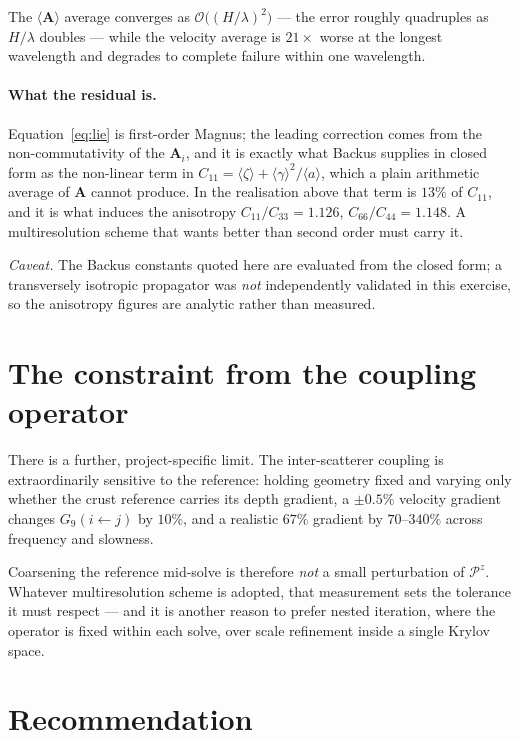 \documentclass[11pt,a4paper]{article}
\newcommand{\bA}{\mathbf{A}}
\newcommand{\avg}[1]{\langle #1 \rangle}
\begin{document}
The $\avg{\bA}$ average converges as $\mathcal{O}\bigl((H/\lambda)^2\bigr)$ ---
the error roughly quadruples as $H/\lambda$ doubles --- while the velocity
average is $21\times$ worse at the longest wavelength and degrades to complete
failure within one wavelength.

\paragraph{What the residual is.}  Equation~\eqref{eq:lie} is first-order
Magnus; the leading correction comes from the non-commutativity of the
$\bA_i$, and it is exactly what Backus supplies in closed form as the
non-linear term in
$C_{11} = \avg{\zeta} + \avg{\gamma}^2/\avg{a}$, which a plain arithmetic
average of $\bA$ cannot produce.  In the realisation above that term is
$13\%$ of $C_{11}$, and it is what induces the anisotropy
$C_{11}/C_{33} = 1.126$, $C_{66}/C_{44} = 1.148$.  A multiresolution scheme
that wants better than second order must carry it.

\emph{Caveat.}  The Backus constants quoted here are evaluated from the closed
form; a transversely isotropic propagator was \emph{not} independently
validated in this exercise, so the anisotropy figures are analytic rather than
measured.

\section{The constraint from the coupling operator}

There is a further, project-specific limit.  The inter-scatterer coupling is
extraordinarily sensitive to the reference: holding geometry fixed and varying
only whether the crust reference carries its depth gradient, a $\pm0.5\%$
velocity gradient changes $G_9(i\!\leftarrow\! j)$ by $10\%$, and a realistic
$67\%$ gradient by $70$--$340\%$ across frequency and slowness.

Coarsening the reference mid-solve is therefore \emph{not} a small perturbation
of $\mathcal{P}^{z}$.  Whatever multiresolution scheme is adopted, that
measurement sets the tolerance it must respect --- and it is another reason to
prefer nested iteration, where the operator is fixed within each solve, over
scale refinement inside a single Krylov space.

\section{Recommendation}
\end{document}
